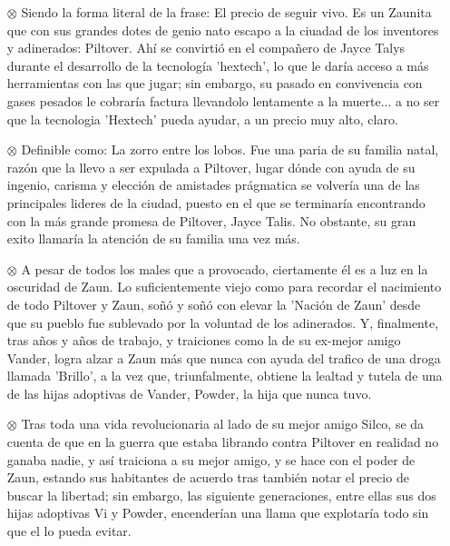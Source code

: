 \documentclass[11pt,A5]{article}
\begin{document}
\begin{itemize}
    \item[$\otimes$] {\textbf{}} Siendo la forma literal de la frase: El precio de seguir vivo. Es un Zaunita que con sus grandes dotes de genio nato escapo a la ciuadad de los inventores y adinerados: Piltover. Ahí se convirtió en el compañero de Jayce Talys durante el desarrollo de la tecnología 'hextech', lo que le daría acceso a más herramientas con las que jugar; sin embargo, su pasado en convivencia con gases pesados le cobraría factura llevandolo lentamente a la muerte... a no ser que la tecnologia 'Hextech' pueda ayudar, a un precio muy alto, claro.
    \item[$\otimes$] {\textbf{}} Definible como: La zorro entre los lobos. Fue una paria de su familia natal, razón que la llevo a ser expulada a Piltover, lugar dónde con ayuda de su ingenio, carisma y elección de amistades prágmatica se volvería una de las principales lideres de la ciudad, puesto en el que se terminaría encontrando con la más grande promesa de Piltover, Jayce Talis. No obstante, su gran exito llamaría la atención de su familia una vez más.
    \item[$\otimes$] {\textbf{}} A pesar de todos los males que a provocado, ciertamente él es a luz en la oscuridad de Zaun. Lo suficientemente viejo como para recordar el nacimiento de todo Piltover y Zaun, soñó y soñó con elevar la 'Nación de Zaun' desde que su pueblo fue sublevado por la voluntad de los adinerados. Y, finalmente, tras años y años de trabajo, y traiciones como la de su ex-mejor amigo Vander, logra alzar a Zaun más que nunca con ayuda del trafico de una droga llamada 'Brillo', a la vez que, triunfalmente, obtiene la lealtad y tutela de una de las hijas adoptivas de Vander, Powder, la hija que nunca tuvo.
    \item[$\otimes$] {\textbf{}} Tras toda una vida revolucionaria al lado de su mejor amigo Silco, se da cuenta de que en la guerra que estaba librando contra Piltover en realidad no ganaba nadie, y así traiciona a su mejor amigo, y se hace con el poder de Zaun, estando sus habitantes de acuerdo tras también notar el precio de buscar la libertad; sin embargo, las siguiente generaciones, entre ellas sus dos hijas adoptivas Vi y Powder, encenderían una llama que explotaría todo sin que el lo pueda evitar.
\end{itemize}
\end{document}
